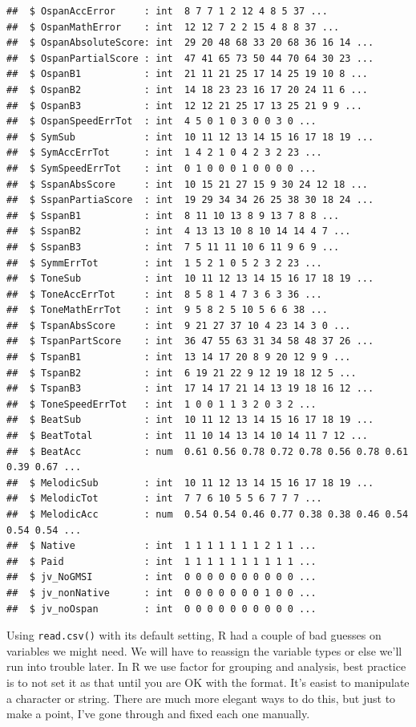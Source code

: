 \documentclass[]{book}
\theoremstyle{definition}
\theoremstyle{definition}
\theoremstyle{definition}
\theoremstyle{remark}
\begin{document}
\begin{verbatim}
##  $ OspanAccError     : int  8 7 7 1 2 12 4 8 5 37 ...
##  $ OspanMathError    : int  12 12 7 2 2 15 4 8 8 37 ...
##  $ OspanAbsoluteScore: int  29 20 48 68 33 20 68 36 16 14 ...
##  $ OspanPartialScore : int  47 41 65 73 50 44 70 64 30 23 ...
##  $ OspanB1           : int  21 11 21 25 17 14 25 19 10 8 ...
##  $ OspanB2           : int  14 18 23 23 16 17 20 24 11 6 ...
##  $ OspanB3           : int  12 12 21 25 17 13 25 21 9 9 ...
##  $ OspanSpeedErrTot  : int  4 5 0 1 0 3 0 0 3 0 ...
##  $ SymSub            : int  10 11 12 13 14 15 16 17 18 19 ...
##  $ SymAccErrTot      : int  1 4 2 1 0 4 2 3 2 23 ...
##  $ SymSpeedErrTot    : int  0 1 0 0 0 1 0 0 0 0 ...
##  $ SspanAbsScore     : int  10 15 21 27 15 9 30 24 12 18 ...
##  $ SspanPartiaScore  : int  19 29 34 34 26 25 38 30 18 24 ...
##  $ SspanB1           : int  8 11 10 13 8 9 13 7 8 8 ...
##  $ SspanB2           : int  4 13 13 10 8 10 14 14 4 7 ...
##  $ SspanB3           : int  7 5 11 11 10 6 11 9 6 9 ...
##  $ SymmErrTot        : int  1 5 2 1 0 5 2 3 2 23 ...
##  $ ToneSub           : int  10 11 12 13 14 15 16 17 18 19 ...
##  $ ToneAccErrTot     : int  8 5 8 1 4 7 3 6 3 36 ...
##  $ ToneMathErrTot    : int  9 5 8 2 5 10 5 6 6 38 ...
##  $ TspanAbsScore     : int  9 21 27 37 10 4 23 14 3 0 ...
##  $ TspanPartScore    : int  36 47 55 63 31 34 58 48 37 26 ...
##  $ TspanB1           : int  13 14 17 20 8 9 20 12 9 9 ...
##  $ TspanB2           : int  6 19 21 22 9 12 19 18 12 5 ...
##  $ TspanB3           : int  17 14 17 21 14 13 19 18 16 12 ...
##  $ ToneSpeedErrTot   : int  1 0 0 1 1 3 2 0 3 2 ...
##  $ BeatSub           : int  10 11 12 13 14 15 16 17 18 19 ...
##  $ BeatTotal         : int  11 10 14 13 14 10 14 11 7 12 ...
##  $ BeatAcc           : num  0.61 0.56 0.78 0.72 0.78 0.56 0.78 0.61 0.39 0.67 ...
##  $ MelodicSub        : int  10 11 12 13 14 15 16 17 18 19 ...
##  $ MelodicTot        : int  7 7 6 10 5 5 6 7 7 7 ...
##  $ MelodicAcc        : num  0.54 0.54 0.46 0.77 0.38 0.38 0.46 0.54 0.54 0.54 ...
##  $ Native            : int  1 1 1 1 1 1 1 2 1 1 ...
##  $ Paid              : int  1 1 1 1 1 1 1 1 1 1 ...
##  $ jv_NoGMSI         : int  0 0 0 0 0 0 0 0 0 0 ...
##  $ jv_nonNative      : int  0 0 0 0 0 0 0 1 0 0 ...
##  $ jv_noOspan        : int  0 0 0 0 0 0 0 0 0 0 ...
\end{verbatim}

Using \texttt{read.csv()} with its default setting, R had a couple of
bad guesses on variables we might need. We will have to reassign the
variable types or else we'll run into trouble later. In R we use factor
for grouping and analysis, best practice is to not set it as that until
you are OK with the format. It's easist to manipulate a character or
string. There are much more elegant ways to do this, but just to make a
point, I've gone through and fixed each one manually.
\end{document}
